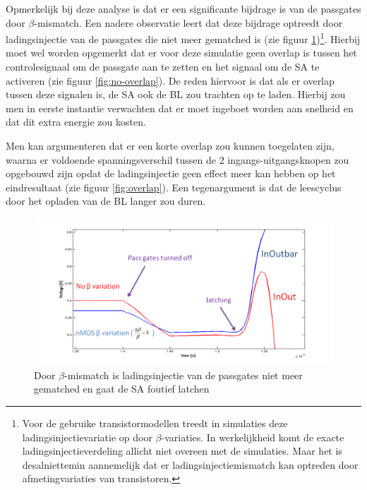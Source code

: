 Opmerkelijk bij deze analyse is dat er een significante bijdrage is van de passgates door $\beta$-mismatch. Een nadere observatie leert dat deze bijdrage optreedt door ladingsinjectie van de passgates die niet meer gematched is (zie figuur \ref{fig:chargeinjectionmismatch})\footnote{Voor de gebruike transistormodellen treedt in simulaties deze ladingsinjectievariatie op door $\beta$-variaties. In werkelijkheid komt de exacte ladingsinjectieverdeling allicht niet overeen met de simulaties. Maar het is desalniettemin aannemelijk dat er ladingsinjectiemismatch kan optreden door afmetingvariaties van transistoren.}.
Hierbij moet wel worden opgemerkt dat er voor deze simulatie geen overlap is tussen het controlesignaal om de passgate aan te zetten en het signaal om de SA te activeren (zie figuur \ref{fig:no-overlap}).
De reden hiervoor is dat als er overlap tussen deze signalen is, de SA ook de BL zou trachten op te laden. Hierbij zou men in eerste instantie verwachten dat er moet ingeboet worden aan snelheid en dat dit extra energie zou kosten.

Men kan argumenteren dat er een korte overlap zou kunnen toegelaten zijn, waarna er voldoende spanningsverschil tussen de 2 ingangs-uitgangsknopen zou opgebouwd zijn opdat de ladingsinjectie geen effect meer kan hebben op het eindresultaat (zie figuur \ref{fig:overlap}). Een tegenargument is dat de leescyclus door het opladen van de BL langer zou duren.
\begin{figure}
  \centering
  \includegraphics[scale=0.4]{../fig/hfdstk-sensamp-chargeinjectionmismatch.png}
  \caption[Foutief latchen door $\beta$-mismatch]{Door $\beta$-mismatch is ladingsinjectie van de passgates niet meer gematched en gaat de SA foutief latchen}
  \label{fig:chargeinjectionmismatch}
\end{figure}

